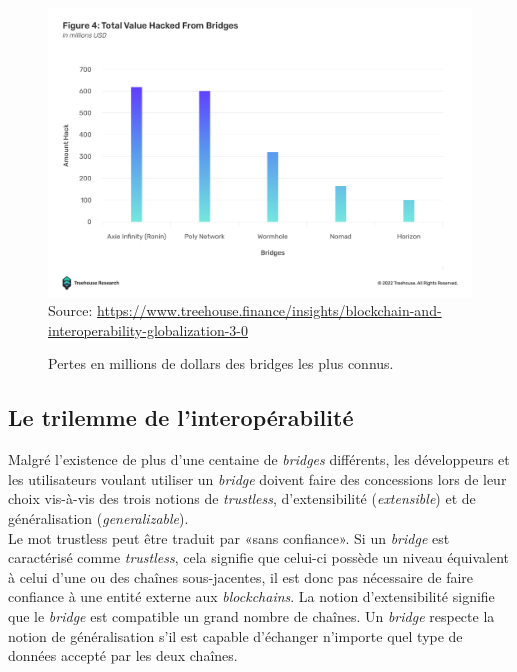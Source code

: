 \begin{figure}[h!]
    \centering
\includegraphics[scale=0.30]{centralisation/imagesBridges/GraphLossesBridges.png}
    {\scriptsize
            Source: \url{https://www.treehouse.finance/insights/blockchain-and-interoperability-globalization-3-0}}
    \caption{Pertes en millions de dollars des bridges les plus connus.}
    \label{fig:GraphBridges}
\end{figure}

\subsection{Le trilemme de l’interopérabilité}

Malgré l’existence de plus d’une centaine de \textit{bridges} différents, les développeurs et les utilisateurs voulant utiliser un \textit{bridge} doivent faire des concessions lors de leur choix vis-à-vis des trois notions de \textit{trustless}, d’extensibilité (\textit{extensible}) et de généralisation (\textit{generalizable}).\\

Le mot trustless peut être traduit par «sans confiance». Si un \textit{bridge} est caractérisé comme \textit{trustless}, cela signifie que celui-ci possède un niveau équivalent à celui d’une ou des chaînes sous-jacentes, il est donc pas nécessaire de faire confiance à une entité externe aux \textit{blockchains}.  La notion  d’extensibilité signifie que le \textit{bridge} est compatible un grand nombre de chaînes.
Un \textit{bridge} respecte la notion de généralisation s’il est capable d'échanger n’importe quel type de données accepté par les deux chaînes.\\

